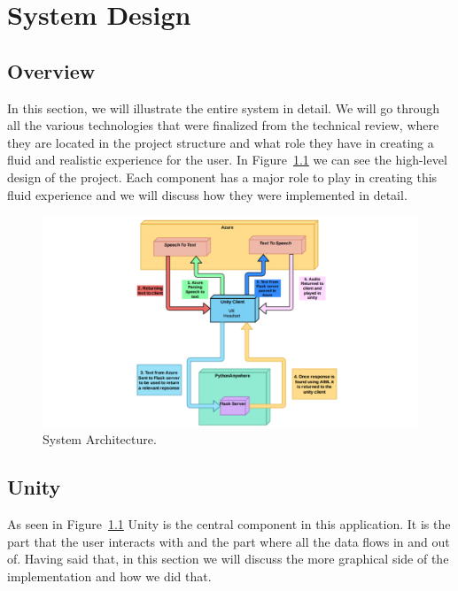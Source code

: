 \chapter{System Design}

\section{Overview}
In this section, we will illustrate the entire system in detail. We will go through all the various technologies that were finalized from the technical review, where they are located in the project structure and what role they have in creating a fluid and realistic experience for the user. In Figure~\ref{image:SystemArch} we can see the high-level design of the project. Each component has a major role to play in creating this fluid experience and we will discuss how they were implemented in detail.

\begin{figure}[h!]
	\caption{System Architecture.}
	\label{image:SystemArch}
	\centering
	\includegraphics[width=1\textwidth]{Images/uml2.png}
\end{figure}

\section{Unity}
As seen in Figure~\ref{image:SystemArch} Unity is the central component in this application. It is the part that the user interacts with and the part where all the data flows in and out of. Having said that, in this section we will discuss the more graphical side of the implementation and how we did that.

